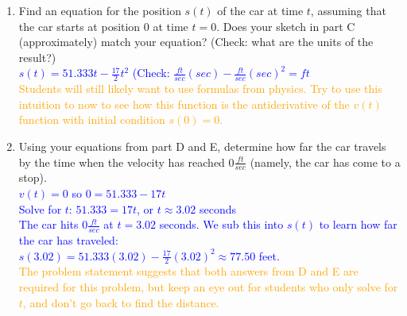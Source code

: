 \documentclass{ximera}
\begin{document}
\begin{exercise}
\begin{enumerate}
        \item[E.] Find an equation for the position $s(t)$ of the car at time $t$, assuming that the car starts at position 0 at time $t=0$. Does your sketch in part C (approximately) match your equation? (Check: what are the units of the result?)\\
        \textcolor{blue}{ $s(t)=51.333t-\frac{17}{2}t^2$ (Check: $\frac{ft}{sec}(sec)-\frac{ft}{sec}(sec)^2=ft$ }\\
        \textcolor{orange}{ Students will still likely want to use formulas from physics. Try to use this intuition to now to see how this function is the antiderivative of the $v(t)$ function with initial condition $s(0)=0$.}
        
        \item[F.] Using your equations from part D and E, determine how far the car travels by the time when the velocity has reached $0 \frac{ft}{sec}$ (namely, the car has come to a stop).\\
        \textcolor{blue}{ $v(t)=0$ so $0=51.333-17t$\\
        Solve for $t$: $51.333=17t$, or $t\approx 3.02$ seconds \\
        The car hits $0 \frac{ft}{sec}$ at $t=3.02$ seconds.  We sub this into $s(t)$ to learn how far the car has traveled:\\
        $s(3.02)=51.333(3.02)-\frac{17}{2}(3.02)^2\approx77.50$ feet.}\\
        \textcolor{orange}{ The problem statement suggests that both answers from D and E are required for this problem, but keep an eye out for students who only solve for $t$, and don't go back to find the distance.}
    \end{enumerate}
  \end{exercise}
\end{document}
